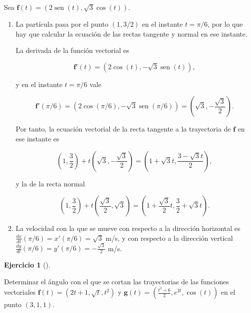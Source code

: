 \documentclass[
  a4paper,
]{scrreport}
\theoremstyle{definition}
\newtheorem{exercise}{Ejercicio}[chapter]
\theoremstyle{remark}
\begin{document}
\begin{tcolorbox}[enhanced jigsaw, left=2mm, coltitle=black, colbacktitle=quarto-callout-tip-color!10!white, opacitybacktitle=0.6, colback=white, breakable, titlerule=0mm, toptitle=1mm, rightrule=.15mm, bottomtitle=1mm, bottomrule=.15mm, toprule=.15mm, leftrule=.75mm, arc=.35mm, opacityback=0, title=\textcolor{quarto-callout-tip-color}{\faLightbulb}\hspace{0.5em}{Solución}, colframe=quarto-callout-tip-color-frame]

Sea \(\mathbf{f}(t)=(2\operatorname{sen}(t), \sqrt{3}\cos(t))\).

\begin{enumerate}
\def\labelenumi{\alph{enumi}.}
\item
  La partícula pasa por el punto \((1,3/2)\) en el instante \(t=\pi/6\),
  por lo que hay que calcular la ecuación de las rectas tangente y
  normal en ese instante.

  La derivada de la función vectorial es

  \[
  \mathbf{f}'(t) = (2\cos(t), -\sqrt{3}\operatorname{sen}(t)),
  \]

  y en el instante \(t=\pi/6\) vale

  \[
  \mathbf{f}'(\pi/6) = (2\cos(\pi/6), -\sqrt{3}\operatorname{sen}(\pi/6)) = \left(\sqrt{3},-\frac{\sqrt{3}}{2}\right).
  \]

  Por tanto, la ecuación vectorial de la recta tangente a la trayectoria
  de \(\mathbf{f}\) en ese instante es

  \[
  \left(1,\frac{3}{2}\right)+ t\left(\sqrt{3},-\frac{\sqrt{3}}{2}\right) 
  = \left(1+\sqrt{3}t,\frac{3-\sqrt{3}t}{2}\right),
  \]

  y la de la recta normal

  \[
  \left(1,\frac{3}{2}\right)+ t\left(\frac{\sqrt{3}}{2},\sqrt{3}\right) 
  = \left(1+\frac{\sqrt{3}}{2}t,\frac{3}{2}+\sqrt{3}t\right).
  \]
\item
  La velocidad con la que se mueve con respecto a la dirección
  horizontal es \(\frac{dx}{dt} (\pi/6) = x'(\pi/6) = \sqrt{3}\) m/s, y
  con respecto a la dirección vertical
  \(\frac{dy}{dt} (\pi/6) = y'(\pi/6) = -\frac{\sqrt{3}}{2}\) m/s.
\end{enumerate}

\end{tcolorbox}

\begin{exercise}[]\protect\hypertarget{exr-angulo-entre-trayectorias}{}\label{exr-angulo-entre-trayectorias}

Determinar el ángulo con el que se cortan las trayectorias de las
funciones vectoriales \(\mathbf{f}(t) = (2t+1, \sqrt{t}, t^2)\) y
\(\mathbf{g}(t)=\left(\frac{t^2+6}{2}, e^{2t}, \cos(t)\right)\) en el
punto \((3,1,1)\).

\end{exercise}
\end{document}
